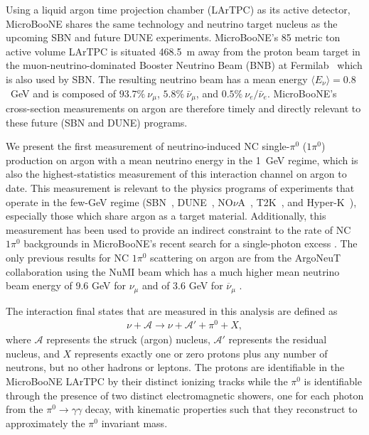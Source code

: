 Using a liquid argon time projection chamber (LArTPC) as its active detector, MicroBooNE \cite{MicroBooNE:2016pwy} shares the same technology and neutrino target nucleus as the upcoming SBN and future DUNE experiments. MicroBooNE's 85 metric ton active volume LArTPC is situated 468.5~m away from the proton beam target in the muon-neutrino-dominated Booster Neutrino Beam (BNB) at Fermilab~\cite{BNBflux} which is also used by SBN. The resulting neutrino beam has a mean energy $\langle E_\nu\rangle = 0.8$~GeV and is composed of $93.7\%~\nu_\mu$, $5.8\%~\bar{\nu}_\mu$, and $0.5\%~\nu_e/\bar{\nu}_e$. MicroBooNE's cross-section measurements on argon are therefore timely and directly relevant to these future (SBN and DUNE) programs.

We present the first measurement of neutrino-induced NC single-$\pi^0$ ($1\pi^0$) production on argon with a mean neutrino energy in the 1~GeV regime, which is also the highest-statistics measurement of this interaction channel on argon to date. This measurement is relevant to the physics programs of experiments that operate in the few-GeV regime (SBN~\cite{SBNproposal}, DUNE~\cite{DUNE:2020ypp}, NO$\nu$A~\cite{MINERvA:2016iqn,NOvA:2019bdw}, T2K~\cite{T2Kflux}, and Hyper-K~\cite{Hyper-KamiokandeProto-:2015xww}), especially those which share argon as a target material. Additionally, this measurement has been used to provide an indirect constraint to the rate of NC $1\pi^0$ backgrounds in MicroBooNE's recent search for a single-photon excess \cite{MicroBooNE:2021zai}. The only previous results for NC $1\pi^0$ scattering on argon are from the ArgoNeuT collaboration using the NuMI beam which has a much higher mean neutrino beam energy of 9.6 GeV for $\nu_\mu$ and of 3.6 GeV for $\overline{\nu}_\mu$  \cite{ArgoNeuT:2015ldo}. 

The interaction final states that are measured in this analysis are defined as
\begin{eqnarray}
\label{reaction}
\nu + \mathcal{A} \rightarrow \nu + \mathcal{A'} + \pi^0 + X,
\end{eqnarray}
where $\mathcal{A}$ represents the struck (argon) nucleus, $\mathcal{A'}$ represents the residual nucleus, and $X$ represents exactly one or zero protons plus any number of neutrons, but no other hadrons or leptons. The protons are identifiable in the MicroBooNE LArTPC by their distinct ionizing tracks while the $\pi^0$ is identifiable through the presence of two distinct electromagnetic showers, one for each photon from the $\pi^0\rightarrow\gamma\gamma$ decay, with kinematic properties such that they reconstruct to approximately the $\pi^0$ invariant mass.  

